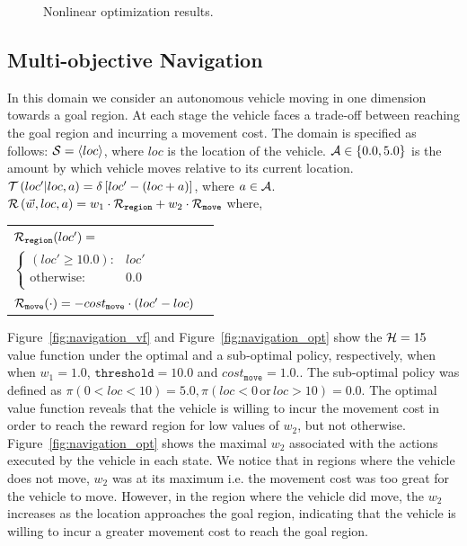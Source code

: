 {\begin{figure}[ht]
\begin{tabular}{ccc}
        \end{tabular}
        \caption{Nonlinear optimization results.}
        \label{tab:opt_results}
    \end{figure}
}

\subsection{Multi-objective Navigation}
\label{sec:results_navigation}

In this domain we consider an autonomous vehicle moving in one dimension towards a goal region. At each stage the vehicle faces a trade-off between reaching the goal region and incurring a movement cost. The domain is specified as follows: {\footnotesize $ \mathcal{S} = \left\langle loc \right\rangle$}, where $ loc $ is the location of the vehicle. {\footnotesize $ \mathcal{A} \in \left\lbrace 0.0, 5.0 \right\rbrace $} is the amount by which vehicle moves relative to its current location. {\footnotesize $ \mathcal{T}\left( loc' | loc, a \right) = \delta \left[ loc' - (loc + a) \right] $}, where {\footnotesize $ a \in \mathcal{A} $}. {\footnotesize $ \mathcal{R}\left(\vec{w}, loc, a \right) = w_1 \cdot \mathcal{R}_{\mathtt{region}} + w_2 \cdot \mathcal{R}_{\mathtt{move}} $} where,
{\footnotesize 
    \abovedisplayskip=10pt
    \belowdisplayskip=0pt
    \renewcommand{\arraystretch}{1.5}
    \begin{tabular}{ll}    
        $ \mathcal{R}_{\mathtt{region}}(loc') = $ &  $ $ \\
        \qquad $ \begin{cases}
        (loc' \geq 10.0 ) : & loc' \\
        \text{otherwise} : & 0.0 \\
        \end{cases} $ & $ $\\
        $ \mathcal{R}_{\mathtt{move}}(\cdot) = -cost_{\mathtt{move}} \cdot (loc' - loc)$ & $ $ \\                        
    \end{tabular}
} 

Figure~\ref{fig:navigation_vf} and Figure~\ref{fig:navigation_opt} show the {\footnotesize$ \mathcal{H} = 15 $} value function under the optimal and a sub-optimal policy, respectively, when when {\footnotesize $w_1 = 1.0$}, {\footnotesize $ \mathtt{threshold} = 10.0 $} and {\footnotesize$ cost_{\mathtt{move}} = 1.0$.}. The sub-optimal policy was defined as $ \pi(0 < loc < 10) = 5.0,  \pi(loc < 0 \,\mathrm{or}\, loc > 10) = 0.0$. The optimal value function reveals that the vehicle is willing to incur the movement cost in order to reach the reward region for low values of {\footnotesize $ w_2 $}, but not otherwise. Figure~\ref{fig:navigation_opt} shows the maximal {\footnotesize $ w_2 $} associated with the actions executed by the vehicle in each state. We notice that in regions where the vehicle does not move, {\footnotesize $ w_2 $} was at its maximum i.e. the movement cost was too great for the vehicle to move. However, in the region where the vehicle did move, the {\footnotesize $ w_2 $} increases as the location approaches the goal region, indicating that the vehicle is willing to incur a greater movement cost to reach the goal region.

